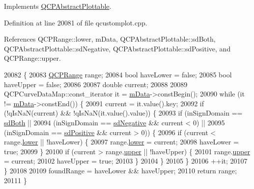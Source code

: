 Implements \hyperlink{class_q_c_p_abstract_plottable_a345d702b2e7e12c8cfdddff65ba85e8c}{Q\+C\+P\+Abstract\+Plottable}.



Definition at line 20081 of file qcustomplot.\+cpp.



References Q\+C\+P\+Range\+::lower, m\+Data, Q\+C\+P\+Abstract\+Plottable\+::sd\+Both, Q\+C\+P\+Abstract\+Plottable\+::sd\+Negative, Q\+C\+P\+Abstract\+Plottable\+::sd\+Positive, and Q\+C\+P\+Range\+::upper.


\begin{DoxyCode}
20082                                                               \{
20083   \hyperlink{class_q_c_p_range}{QCPRange} range;
20084   \textcolor{keywordtype}{bool} haveLower = \textcolor{keyword}{false};
20085   \textcolor{keywordtype}{bool} haveUpper = \textcolor{keyword}{false};
20086 
20087   \textcolor{keywordtype}{double} current;
20088 
20089   QCPCurveDataMap::const\_iterator it = \hyperlink{class_q_c_p_curve_a88d533e455bca96004b049e99168731b}{mData}->constBegin();
20090   \textcolor{keywordflow}{while} (it != \hyperlink{class_q_c_p_curve_a88d533e455bca96004b049e99168731b}{mData}->constEnd()) \{
20091     current = it.value().key;
20092     \textcolor{keywordflow}{if} (!qIsNaN(current) && !qIsNaN(it.value().value)) \{
20093       \textcolor{keywordflow}{if} (inSignDomain == \hyperlink{class_q_c_p_abstract_plottable_a661743478a1d3c09d28ec2711d7653d8a082b98cfb91a7363a3b5cd17b0c1cd60}{sdBoth} ||
20094           (inSignDomain == \hyperlink{class_q_c_p_abstract_plottable_a661743478a1d3c09d28ec2711d7653d8a0fc9a70796ef60ad18ddd18056e6dc63}{sdNegative} && current < 0) ||
20095           (inSignDomain == \hyperlink{class_q_c_p_abstract_plottable_a661743478a1d3c09d28ec2711d7653d8a02951859f243a4d24e779cfbb5471030}{sdPositive} && current > 0)) \{
20096         \textcolor{keywordflow}{if} (current < range.\hyperlink{class_q_c_p_range_aa3aca3edb14f7ca0c85d912647b91745}{lower} || !haveLower) \{
20097           range.\hyperlink{class_q_c_p_range_aa3aca3edb14f7ca0c85d912647b91745}{lower} = current;
20098           haveLower = \textcolor{keyword}{true};
20099         \}
20100         \textcolor{keywordflow}{if} (current > range.\hyperlink{class_q_c_p_range_ae44eb3aafe1d0e2ed34b499b6d2e074f}{upper} || !haveUpper) \{
20101           range.\hyperlink{class_q_c_p_range_ae44eb3aafe1d0e2ed34b499b6d2e074f}{upper} = current;
20102           haveUpper = \textcolor{keyword}{true};
20103         \}
20104       \}
20105     \}
20106     ++it;
20107   \}
20108 
20109   foundRange = haveLower && haveUpper;
20110   \textcolor{keywordflow}{return} range;
20111 \}
\end{DoxyCode}
\hypertarget{class_q_c_p_curve_aad0b69d9a7a2a5367fcc9fe3edaf9bf4}{}
